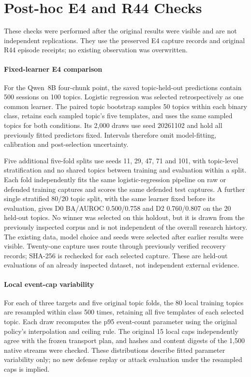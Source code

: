 \section{Post-hoc E4 and R44 Checks}\label{app:r49-checks}
These checks were performed after the original results were visible and are not independent replications. They use the preserved E4 capture records and original R44 episode receipts; no existing observation was overwritten.

\paragraph{Fixed-learner E4 comparison}
For the Qwen~8B four-chunk point, the saved topic-held-out predictions contain 500 sessions on 100 topics. Logistic regression was selected retrospectively as one common learner. The paired topic bootstrap samples 50 topics within each binary class, retains each sampled topic's five templates, and uses the same sampled topics for both conditions. Its 2,000 draws use seed 20261102 and hold all previously fitted predictors fixed. Intervals therefore omit model-fitting, calibration and post-selection uncertainty.

Five additional five-fold splits use seeds 11, 29, 47, 71 and 101, with topic-level stratification and no shared topics between training and evaluation within a split. Each fold independently fits the same logistic-regression pipeline on raw or defended training captures and scores the same defended test captures. A further single stratified 80/20 topic split, with the same learner fixed before its evaluation, gives D0 BA/AUROC 0.500/0.758 and D2 0.760/0.807 on the 20 held-out topics. No winner was selected on this holdout, but it is drawn from the previously inspected corpus and is not independent of the overall research history. The existing data, model choice and seeds were selected after earlier results were visible. Twenty-one capture uses route through previously verified recovery records; SHA-256 is rechecked for each selected capture. These are held-out evaluations of an already inspected dataset, not independent external evidence.

\paragraph{Local event-cap variability}
For each of three targets and five original topic folds, the 80 local training topics are resampled within class 500 times, retaining all five templates of each selected topic. Each draw recomputes the p95 event-count parameter using the original policy's interpolation and ceiling rule. The original 15 local caps independently agree with the frozen transport plan, and hashes and content digests of the 1,500 native streams were checked. These distributions describe fitted parameter variability only; no new defense replay or attack evaluation under the resampled caps is implied.

